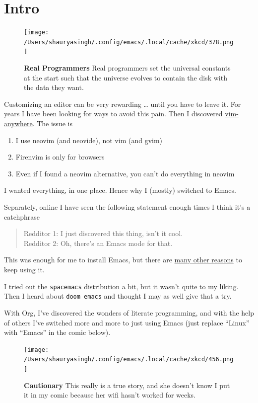 \documentclass{scrartcl}
\begin{document}
\section{Intro}
\label{sec:orgb65e2a8}
\begin{figure}[!htb]
	  \centering
	  \texttt{[image: /Users/shauryasingh/.config/emacs/.local/cache/xkcd/378.png]}
  \caption*{\label{xkcd:378} \textbf{Real Programmers} Real programmers set the universal constants at the start such that the universe evolves to contain the disk with the data they want.}
	\end{figure}

Customizing an editor can be very rewarding \ldots{} until you have to leave it.
For years I have been looking for ways to avoid this pain.
Then I discovered \href{https://github.com/cknadler/vim-anywhere}{vim-anywhere}. The issue is

\begin{enumerate}
\item I use neovim (and neovide), not vim (and gvim)
\item Firenvim is only for browsers
\item Even if I found a neovim alternative, you can't do everything in neovim
\end{enumerate}

I wanted everything, in one place. Hence why I (mostly) switched to Emacs.

Separately, online I have seen the following statement enough times I think it's a catchphrase
\begin{quote}
Redditor 1: I just discovered this thing, isn't it cool. \\
Redditor 2: Oh, there's an Emacs mode for that.
\end{quote}

This was enough for me to install Emacs, but there are
\href{https://github.com/remacs/remacs\#why-emacs}{many other reasons} to keep using it.

I tried out the \texttt{spacemacs} distribution a bit, but it wasn't quite to my liking.
Then I heard about \texttt{doom emacs} and thought I may as well give that a try.

With Org, I've discovered the wonders of literate programming, and with the help
of others I've switched more and more to just using Emacs (just replace
``Linux'' with ``Emacs'' in the comic below).

\begin{figure}[!htb]
	  \centering
	  \texttt{[image: /Users/shauryasingh/.config/emacs/.local/cache/xkcd/456.png]}
  \caption*{\label{xkcd:456} \textbf{Cautionary} This really is a true story, and she doesn't know I put it in my comic because her wifi hasn't worked for weeks.}
	\end{figure}
\end{document}
